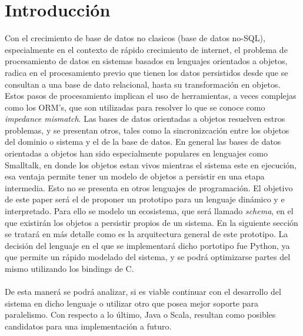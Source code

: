 \documentclass{melta}
\begin{document}
\section{Introducción}
\label{sec:introduccion}
Con el crecimiento de base de datos no clasicos (base de datos no-SQL), especialmente en el contexto de rápido crecimiento de internet, el problema de procesamiento de datos en sistemas basados en lenguajes orientados a objetos, radica en el procesamiento previo que tienen los datos persistidos desde que se consultan a una base de dato relacional, hasta su transformación en objetos. Estos pasos de procesamiento implican el uso de herramientas, a veces complejas como los ORM's, que son utilizadas para resolver lo que se conoce como \textit{impedance mismatch}.
Las bases de datos orientadas a objetos resuelven estros problemas, y se presentan otros, tales como la sincronizcación entre los objetos del dominio o sistema y el de la base de datos. 
En general las bases de datos orientadas a objetos han sido especialmente populares en lenguajes como Smalltalk, en donde los objetos estan vivos mientras el sistema este en ejecución, esa ventaja permite tener un modelo de objetos a persistir en una etapa intermedia. Esto no se presenta en otros lenguajes de programación. El objetivo de este paper será el de proponer un prototipo para un lenguaje dinámico y e interpretado.
Para ello se modelo un ecosistema, que será llamado \textit{schema}, en el que existirán los objetos a persistir propios de un sistema. En la siguiente sección se tratará en más detalle como es la arquitectura general de este prototipo. 
La decisión del lenguaje en el que se implementará dicho portotipo fue Python, ya que permite un rápido modelado del sistema, y se podrá optimizarse partes del mismo utilizando los bindings de C. 
\\\\
De esta manerá se podrá analizar, si es viable continuar con el desarrollo del sistema en dicho lenguaje o utilizar otro que posea mejor soporte para paralelismo. Con respecto a lo último, Java o Scala, resultan como posibles candidatos para una implementación a futuro.
\end{document}
